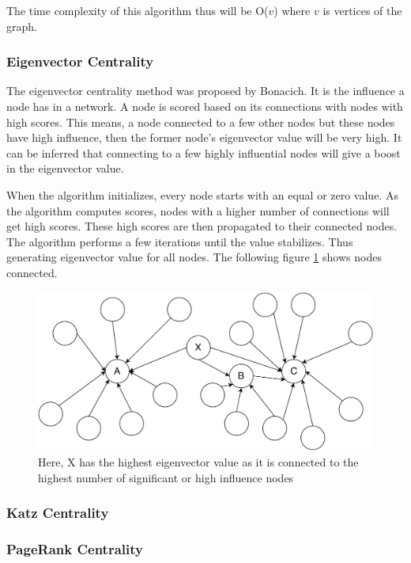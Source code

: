 \documentclass[journal,twoside,web]{ieeecolor}
\begin{document}
The time complexity of this algorithm thus will be O($v$) where $v$ is vertices of the graph.

\subsubsection{Eigenvector Centrality}
The eigenvector centrality method was proposed by Bonacich\cite{26}. It is the influence a node has in a network. A node is scored based on its connections with nodes with high scores. This means, a node connected to a few other nodes but these nodes have high influence, then the former node's eigenvector value will be very high. It can be inferred that connecting to a few highly influential nodes will give a boost in the eigenvector value.

When the algorithm initializes, every node starts with an equal or zero value. As the algorithm computes scores, nodes with a higher number of connections will get high scores. These high scores are then propagated to their connected nodes. The algorithm performs a few iterations until the value stabilizes. Thus generating eigenvector value for all nodes. The following figure \ref{fig8} shows nodes connected.

\begin{figure}[!h]
    \centerline{\includegraphics[scale=0.45]{figures/eigenvector_centrality.pdf}}
    \caption{Here, X has the highest eigenvector value as it is connected to the highest number of significant or high influence nodes}
    \label{fig8}
\end{figure}

\subsubsection{Katz Centrality}
\subsubsection{PageRank Centrality}
\end{document}
